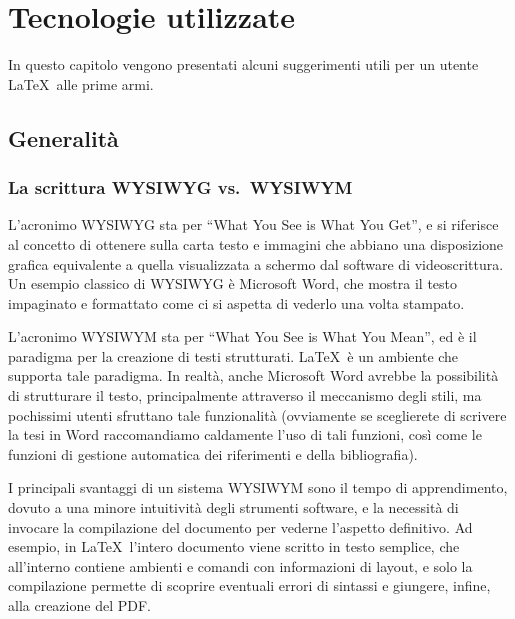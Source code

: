 \chapter{Tecnologie utilizzate}
\label{cap3}

In questo capitolo vengono presentati alcuni suggerimenti utili per un utente \LaTeX\ alle prime armi.


\section{Generalit\`a}

\subsection{La scrittura WYSIWYG vs.\ WYSIWYM}

L'acronimo WYSIWYG sta per ``What You See is What You Get'', e si riferisce al concetto di ottenere sulla carta testo e immagini che abbiano una disposizione grafica equivalente a quella visualizzata a schermo dal software di videoscrittura. Un esempio classico di WYSIWYG è Microsoft Word, che mostra il testo impaginato e formattato come ci si aspetta di vederlo una volta stampato.

L'acronimo WYSIWYM sta per ``What You See is What You Mean'', ed è il paradigma per la creazione di testi strutturati. \LaTeX\ è un ambiente che supporta tale paradigma. In realtà, anche Microsoft Word avrebbe la possibilità di strutturare il testo, principalmente attraverso il meccanismo degli stili, ma pochissimi utenti sfruttano tale funzionalità (ovviamente se sceglierete di scrivere la tesi in Word raccomandiamo caldamente l'uso di tali funzioni, così come le funzioni di gestione automatica dei riferimenti e della bibliografia).

I principali svantaggi di un sistema WYSIWYM sono il tempo di apprendimento, dovuto a una minore intuitività degli strumenti software, e la necessità di invocare la compilazione del documento per vederne l'aspetto definitivo. Ad esempio, in \LaTeX\ l'intero documento viene scritto in testo semplice, che all'interno contiene ambienti e comandi con informazioni di layout, e solo la compilazione permette di scoprire eventuali errori di sintassi e giungere, infine, alla creazione del PDF. 

